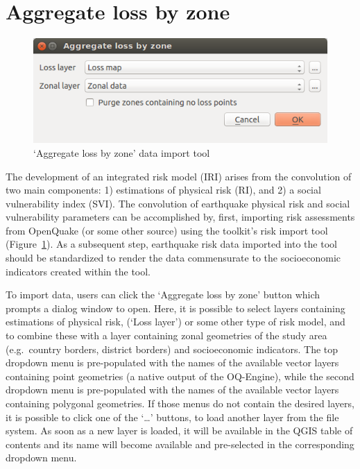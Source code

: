 \section{Aggregate loss by zone}

\begin{figure}
    \centering
    \includegraphics[width=\textwidth]{../images/image08}
    \caption{`Aggregate loss by zone' data import tool}
    \label{fig:aggregate_loss_by_zone}
\end{figure}

The development of an integrated risk model (IRI) arises from the convolution
of two main components: 1) estimations of physical risk (RI), and 2) a social
vulnerability index (SVI). The convolution of earthquake physical risk and
social vulnerability parameters can be accomplished by, first, importing risk
assessments from OpenQuake (or some other source) using the toolkit's risk
import tool (Figure~\ref{fig:aggregate_loss_by_zone}). As a subsequent step,
earthquake risk data imported into the tool should be standardized to render
the data commensurate to the socioeconomic indicators created within the tool.

To import data, users can click the `Aggregate loss by zone' button which
prompts a dialog window to open. Here, it is possible to select layers
containing estimations of physical risk, (`Loss layer') or some other type of
risk model, and to combine these with a layer containing zonal geometries of
the study area (e.g.\ country borders, district borders) and socioeconomic
indicators. The top dropdown menu is pre-populated with the names of the
available vector layers containing point geometries (a native output of the
OQ-Engine), while the second dropdown menu is pre-populated with the names of
the available vector layers containing polygonal geometries. If those menus do
not contain the desired layers, it is possible to click one of the `\dots'
buttons, to load another layer from the file system. As soon as a new layer is
loaded, it will be available in the QGIS table of contents and its name will
become available and pre-selected in the corresponding dropdown menu.

